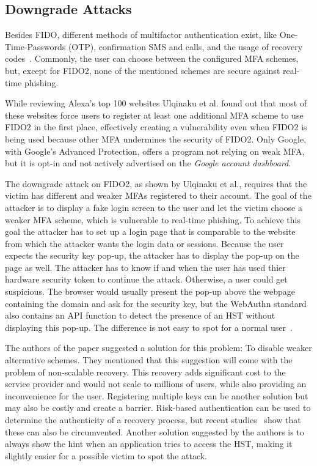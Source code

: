 \documentclass[runningheads]{llncs}
\begin{document}
\subsection{Downgrade Attacks}
Besides FIDO, different methods of multifactor authentication exist, like One-Time-Passwords (OTP), confirmation SMS and calls, and the usage of recovery codes~\cite{000004}. Commonly, the user can choose between the configured MFA schemes, but, except for FIDO2, none of the mentioned schemes are secure against real-time phishing. 

While reviewing Alexa's top 100 websites Ulqinaku et al. found out that most of these websites force users to register at least one additional MFA scheme to use FIDO2 in the first place, effectively creating a vulnerability even when FIDO2 is being used because other MFA undermines the security of FIDO2. Only Google, with Google's Advanced Protection, offers a program not relying on weak MFA, but it is opt-in and not actively advertised on the \textit{Google account dashboard}.

The downgrade attack on FIDO2, as shown by Ulqinaku et al., requires that the victim has different and weaker MFAs registered to their account. The goal of the attacker is to display a fake login screen to the user and let the victim choose a weaker MFA scheme, which is vulnerable to real-time phishing. To achieve this goal the attacker has to set up a login page that is comparable to the website from which the attacker wants the login data or sessions. Because the user expects the security key pop-up, the attacker has to display the pop-up on the page as well. The attacker has to know if and when the user has used thier hardware security token to continue the attack. Otherwise, a user could get suspicious. The browser would usually present the pop-up above the webpage containing the domain and ask for the security key, but the WebAuthn standard also contains an API function to detect the presence of an HST without displaying this pop-up. The difference is not easy to spot for a normal user~\cite{274610}.

The authors of the paper suggested a solution for this problem: To disable weaker alternative schemes. They mentioned that this suggestion will come with the problem of non-scalable recovery. This recovery adds significant cost to the service provider and would not scale to millions of users, while also providing an inconvenience for the user. Registering multiple keys can be another solution but may also be costly and create a barrier. Risk-based authentication can be used to determine the authenticity of a recovery process, but recent studies~\cite{10.1145/3372297.3417892} show that these can also be circumvented. Another solution suggested by the authors is to always show the hint when an application tries to access the HST, making it slightly easier for a possible victim to spot the attack.
\end{document}
